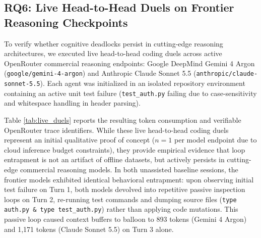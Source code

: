 \documentclass[journal]{IEEEtran}
\begin{document}
\subsection{RQ6: Live Head-to-Head Duels on Frontier Reasoning Checkpoints}
\label{sec:live_duels}

To verify whether cognitive deadlocks persist in cutting-edge reasoning architectures, we executed live head-to-head coding duels across active OpenRouter commercial reasoning endpoints: Google DeepMind Gemini 4 Argon (\texttt{google/gemini-4-argon}) and Anthropic Claude Sonnet 5.5 (\texttt{anthropic/claude-sonnet-5.5}). Each agent was initialized in an isolated repository environment containing an active unit test failure (\texttt{test\_auth.py} failing due to case-sensitivity and whitespace handling in header parsing).

\begin{table}[!t]
\caption{Live End-to-End Coding Duel Telemetry on Frontier Reasoning Endpoints}
\label{tab:live_duels}
\centering
{}
\end{table}

Table \ref{tab:live_duels} reports the resulting token consumption and verifiable OpenRouter trace identifiers. While these live head-to-head coding duels represent an initial qualitative proof of concept ($n=1$ per model endpoint due to cloud inference budget constraints), they provide empirical evidence that loop entrapment is not an artifact of offline datasets, but actively persists in cutting-edge commercial reasoning models. In both unassisted baseline sessions, the frontier models exhibited identical behavioral entrapment: upon observing initial test failure on Turn 1, both models devolved into repetitive passive inspection loops on Turn 2, re-running test commands and dumping source files (\texttt{type auth.py \& type test\_auth.py}) rather than applying code mutations. This passive loop caused context buffers to balloon to 893 tokens (Gemini 4 Argon) and 1,171 tokens (Claude Sonnet 5.5) on Turn 3 alone.
\end{document}
